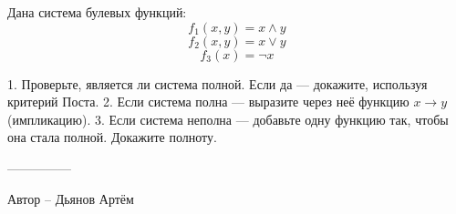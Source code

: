 \question
Дана система булевых функций:
\[ f_1 (x, y) = x \land y \]
\[ f_2 (x, y) = x \lor y \]
\[ f_3 (x) = \lnot x \]

1. Проверьте, является ли система полной. Если да — докажите, используя критерий Поста.
2. Если система полна — выразите через неё функцию $x \to y$ (импликацию).
3. Если система неполна — добавьте одну функцию так, чтобы она стала полной. Докажите полноту.

---------------

Автор -- Дьянов Артём